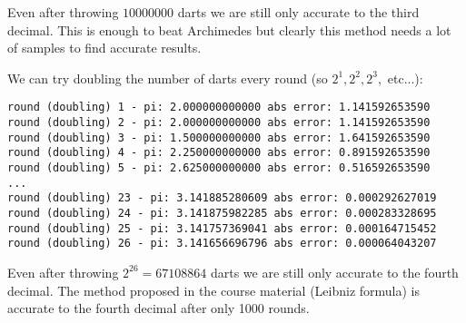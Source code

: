 \documentclass[a4paper,11pt]{article}
\begin{document}
Even after throwing $10000000$ darts we are still only accurate to the third decimal. This is enough to beat Archimedes but clearly this method needs a lot of samples to find accurate results.

We can try doubling the number of darts every round (so $2^1, 2^2, 2^3, $ etc...):

\begin{verbatim}
round (doubling) 1 - pi: 2.000000000000 abs error: 1.141592653590
round (doubling) 2 - pi: 2.000000000000 abs error: 1.141592653590
round (doubling) 3 - pi: 1.500000000000 abs error: 1.641592653590
round (doubling) 4 - pi: 2.250000000000 abs error: 0.891592653590
round (doubling) 5 - pi: 2.625000000000 abs error: 0.516592653590
...
round (doubling) 23 - pi: 3.141885280609 abs error: 0.000292627019
round (doubling) 24 - pi: 3.141875982285 abs error: 0.000283328695
round (doubling) 25 - pi: 3.141757369041 abs error: 0.000164715452
round (doubling) 26 - pi: 3.141656696796 abs error: 0.000064043207
\end{verbatim}

Even after throwing $2^{26} = 67108864$ darts we are still only accurate to the fourth decimal.
The method proposed in the course material (Leibniz formula) is accurate to the fourth decimal after only 1000 rounds.
\end{document}
